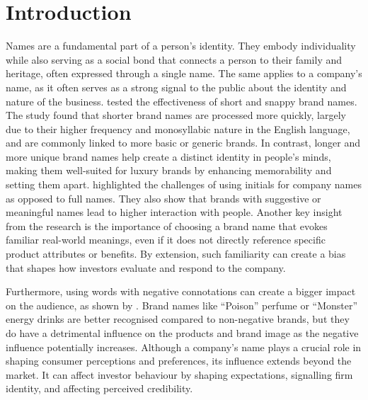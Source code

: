 \documentclass[a4paper,11pt]{report}
\begin{document}
\newpage
\tableofcontents

\newpage
\listoffigures

\newpage
\listoftables

\chapter{Introduction}

Names are a fundamental part of a person's identity. They embody individuality while also serving as a social bond that connects a person to their family and heritage, often expressed through a single name\cite{name1}. The same applies to a company's name, as it often serves as a strong signal to the public about the identity and nature of the business.  tested the effectiveness of short and snappy brand names. The study found that shorter brand names are processed more quickly, largely due to their higher frequency and monosyllabic nature in the English language, and are commonly linked to more basic or generic brands. In contrast, longer and more unique brand names help create a distinct identity in people's minds, making them well-suited for luxury brands by enhancing memorability and setting them apart.  highlighted the challenges of using initials for company names as opposed to full names. They also show that brands with suggestive or meaningful names lead to higher interaction with people. Another key insight from the research is the importance of choosing a brand name that evokes familiar real-world meanings, even if it does not directly reference specific product attributes or benefits. By extension, such familiarity can create a bias that shapes how investors evaluate and respond to the company. 

Furthermore, using words with negative connotations can create a bigger impact on the audience, as shown by . Brand names like ``Poison'' perfume or ``Monster'' energy drinks are better recognised compared to non-negative brands, but they do have a detrimental influence on the products and brand image as the negative influence potentially increases. Although a company's name plays a crucial role in shaping consumer perceptions and preferences, its influence extends beyond the market. It can affect investor behaviour by shaping expectations, signalling firm identity, and affecting perceived credibility.
\end{document}
